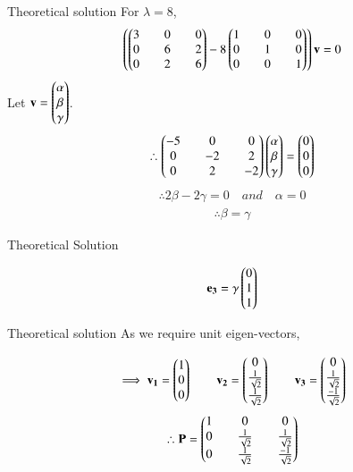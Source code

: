 \documentclass{beamer}
\begin{document}
\begin{frame}{Theoretical solution}
For $\lambda=8$,
\begin{align}
    \left(\begin{pmatrix}3&&0&&0\\0&&6&&2\\0&&2&&6\end{pmatrix}-8\begin{pmatrix}1&&0&&0\\0&&1&&0\\0&&0&&1\end{pmatrix}\right)\mathbf{v}=0
\end{align}
Let $\mathbf{v}=\begin{pmatrix}\alpha\\\beta\\\gamma\end{pmatrix}$.
\begin{align}
    \therefore \begin{pmatrix}-5&&0&&0\\0&&-2&&2\\0&&2&&-2\end{pmatrix}\begin{pmatrix}\alpha\\\beta\\\gamma\end{pmatrix}=\begin{pmatrix}0\\0\\0\end{pmatrix} 
\end{align}
\begin{align}
    \therefore 2\beta-2\gamma=0 \quad and \quad \alpha=0
\end{align}
\begin{align}
    \therefore \beta=\gamma
\end{align}
\end{frame}

\begin{frame}{Theoretical Solution}

\begin{align}
    \mathbf{e_3}=\gamma \begin{pmatrix}0\\1\\1\end{pmatrix}
\end{align}
\end{frame}

\begin{frame}{Theoretical solution}
As we require unit eigen-vectors,

\begin{align}
    \implies \mathbf{v_1}=\begin{pmatrix}1\\0\\0\end{pmatrix} \qquad \mathbf{v_2}=\begin{pmatrix}0\\\frac{1}{\sqrt{2}}\\\frac{1}{\sqrt{2}}\end{pmatrix} \qquad \mathbf{v_3}=\begin{pmatrix}0\\\frac{1}{\sqrt{2}}\\\frac{-1}{\sqrt{2}}\end{pmatrix}
\end{align}
\begin{align}
    \therefore \mathbf{P}=\begin{pmatrix}1&&0&&0\\0&&\frac{1}{\sqrt{2}}&&\frac{1}{\sqrt{2}}\\0&&\frac{1}{\sqrt{2}}&&\frac{-1}{\sqrt{2}}\end{pmatrix}
\end{align}
\end{frame}
\end{document}
